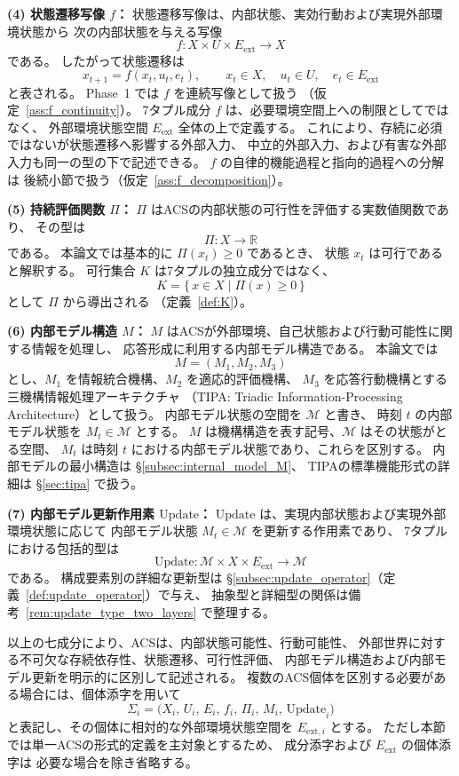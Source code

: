 \begin{definition}[自律認知システム]
\medskip
\noindent\textbf{(4) 状態遷移写像 $f$：}
状態遷移写像は、内部状態、実効行動および実現外部環境状態から
次の内部状態を与える写像
\[
  f:
  X\times U\times E_{\mathrm{ext}}
  \longrightarrow
  X
\]
である。
したがって状態遷移は
\[
  x_{t+1}
  =
  f(x_t,u_t,e_t),
  \qquad
  x_t\in X,\quad
  u_t\in U,\quad
  e_t\in E_{\mathrm{ext}}
\]
と表される。
Phase~1 では $f$ を連続写像として扱う
（仮定~\ref{ass:f_continuity}）。
7タプル成分 $f$ は、必要環境空間上への制限としてではなく、
外部環境状態空間 $E_{\mathrm{ext}}$ 全体の上で定義する。
これにより、存続に必須ではないが状態遷移へ影響する外部入力、
中立的外部入力、および有害な外部入力も同一の型の下で記述できる。
$f$ の自律的機能過程と指向的過程への分解は
後続小節で扱う（仮定~\ref{ass:f_decomposition}）。

\medskip
\noindent\textbf{(5) 持続評価関数 $\Pi$：}
$\Pi$ はACSの内部状態の可行性を評価する実数値関数であり、
その型は
\[
  \Pi:X\longrightarrow\mathbb{R}
\]
である。
本論文では基本的に $\Pi(x_t)\geq0$ であるとき、
状態 $x_t$ は可行であると解釈する。
可行集合 $K$ は7タプルの独立成分ではなく、
\[
  K
  =
  \{\,x\in X\mid \Pi(x)\geq0\,\}
\]
として $\Pi$ から導出される
（定義~\ref{def:K}）。

\medskip
\noindent\textbf{(6) 内部モデル構造 $M$：}
$M$ はACSが外部環境、自己状態および行動可能性に関する情報を処理し、
応答形成に利用する内部モデル構造である。
本論文では
\[
  M=(M_1,M_2,M_3)
\]
とし、$M_1$ を情報統合機構、$M_2$ を適応的評価機構、
$M_3$ を応答行動機構とする三機構情報処理アーキテクチャ
（TIPA: Triadic Information-Processing Architecture）として扱う。
内部モデル状態の空間を $\mathcal{M}$ と書き、
時刻 $t$ の内部モデル状態を $M_t\in\mathcal{M}$ とする。
$M$ は機構構造を表す記号、$\mathcal{M}$ はその状態がとる空間、
$M_t$ は時刻 $t$ における内部モデル状態であり、これらを区別する。
内部モデルの最小構造は \S\ref{subsec:internal_model_M}、
TIPAの標準機能形式の詳細は \S\ref{sec:tipa} で扱う。

\medskip
\noindent\textbf{(7) 内部モデル更新作用素 $\mathrm{Update}$：}
$\mathrm{Update}$ は、実現内部状態および実現外部環境状態に応じて
内部モデル状態 $M_t\in\mathcal{M}$ を更新する作用素であり、
7タプルにおける包括的型は
\[
  \mathrm{Update}:
  \mathcal{M}\times X\times E_{\mathrm{ext}}
  \longrightarrow
  \mathcal{M}
\]
である。
構成要素別の詳細な更新型は
\S\ref{subsec:update_operator}（定義~\ref{def:update_operator}）で与え、
抽象型と詳細型の関係は備考~\ref{rem:update_type_two_layers} で整理する。

\medskip
以上の七成分により、ACSは、内部状態可能性、行動可能性、
外部世界に対する不可欠な存続依存性、状態遷移、可行性評価、
内部モデル構造および内部モデル更新を明示的に区別して記述される。
複数のACS個体を区別する必要がある場合には、個体添字を用いて
\[
  \Sigma_i
  =
  \bigl(
    X_i,\,
    U_i,\,
    E_i,\,
    f_i,\,
    \Pi_i,\,
    M_i,\,
    \mathrm{Update}_i
  \bigr)
\]
と表記し、その個体に相対的な外部環境状態空間を
$E_{\mathrm{ext},i}$ とする。
ただし本節では単一ACSの形式的定義を主対象とするため、
成分添字および $E_{\mathrm{ext}}$ の個体添字は
必要な場合を除き省略する。
\end{definition}

